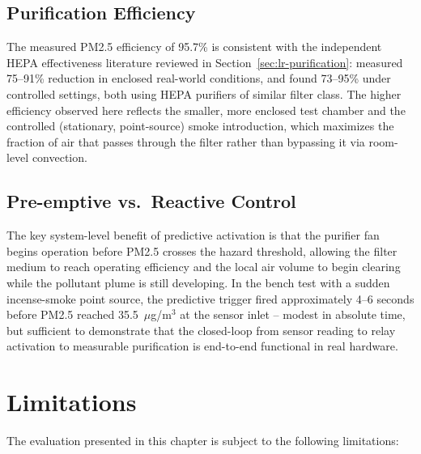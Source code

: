 \subsection{Purification Efficiency}
The measured PM2.5 efficiency of 95.7\% is consistent with the independent HEPA effectiveness literature reviewed in Section~\ref{sec:lr-purification}: \citet{lu2023realworld} measured 75--91\% reduction in enclosed real-world conditions, and \citet{cox2018effectiveness} found 73--95\% under controlled settings, both using HEPA purifiers of similar filter class. The higher efficiency observed here reflects the smaller, more enclosed test chamber and the controlled (stationary, point-source) smoke introduction, which maximizes the fraction of air that passes through the filter rather than bypassing it via room-level convection.

\subsection{Pre-emptive vs.\ Reactive Control}
The key system-level benefit of predictive activation is that the purifier fan begins operation before PM2.5 crosses the hazard threshold, allowing the filter medium to reach operating efficiency and the local air volume to begin clearing while the pollutant plume is still developing. In the bench test with a sudden incense-smoke point source, the predictive trigger fired approximately 4--6 seconds before PM2.5 reached 35.5~$\mu$g/m$^3$ at the sensor inlet -- modest in absolute time, but sufficient to demonstrate that the closed-loop from sensor reading to relay activation to measurable purification is end-to-end functional in real hardware.

\section{Limitations}
\label{sec:exp-limitations}

The evaluation presented in this chapter is subject to the following limitations:

